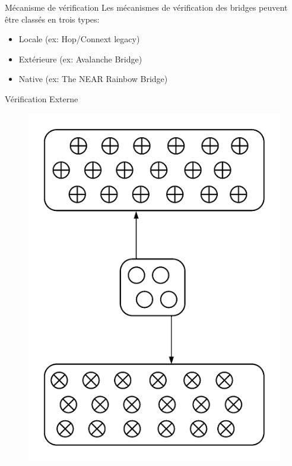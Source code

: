 \begin{frame}{Mécanisme de vérification}
Les mécanismes de vérification des bridges peuvent être classés en trois types:
\begin{itemize}
    \item Locale (ex: Hop/Connext legacy)
    \item Extérieure (ex: Avalanche Bridge)
    \item Native (ex: The NEAR Rainbow Bridge)
\end{itemize}
\end{frame}


\begin{frame}{Vérification Externe}
    \begin{figure}
        \centering
        \includegraphics[scale = 0.5]{img/DiagrammeVerifExterne.png}
    \end{figure}
\end{frame}

